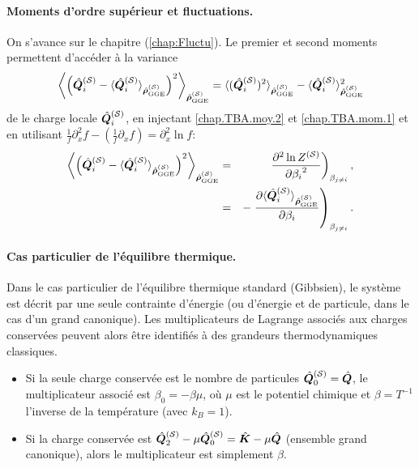 \paragraph{Moments d’ordre supérieur et fluctuations.} On s'avance sur le chapitre (\ref{chap:Fluctu}).
Le premier et second moments permettent d’accéder à la variance 
\begin{eqnarray}
	 \left \langle \left (\hat{\bm{Q}}_i^{(\mathcal{S})} - \langle\hat{\bm{Q}}_i^{(\mathcal{S})} \rangle_{\hat{\bm{\rho}}^{(\mathcal{S})}_{\mathrm{GGE}}} \right )^2  \right \rangle_{\hat{\bm{\rho}}^{(\mathcal{S})}_{\mathrm{GGE}}} = \langle(\hat{\bm{Q}}_i^{(\mathcal{S})})^2 \rangle_{\hat{\bm{\rho}}^{(\mathcal{S})}_{\mathrm{GGE}}}  -  \langle\hat{\bm{Q}}_i^{(\mathcal{S})} \rangle_{\hat{\bm{\rho}}^{(\mathcal{S})}_{\mathrm{GGE}}}^2	
\end{eqnarray}
de le charge locale $\hat{\bm{Q}}_i^{(\mathcal{S})}$, en injectant \eqref{chap.TBA.moy.2} et \eqref{chap.TBA.mom.1} et en utilisant $\frac{1}{f} \partial_x^2 f - ( \frac{1}{f} \partial_x f ) = \partial_x^2 \ln f  $:
\begin{eqnarray}
	\left \langle \left (\hat{\bm{Q}}_i^{(\mathcal{S})} - \langle\hat{\bm{Q}}_i^{(\mathcal{S})} \rangle_{\hat{\bm{\rho}}^{(\mathcal{S})}_{\mathrm{GGE}}} \right )^2  \right \rangle_{\hat{\bm{\rho}}^{(\mathcal{S})}_{\mathrm{GGE}}}  &=&	  \left . \frac{\partial^2 \ln Z^{(\mathcal{S})}  }{{\partial \beta_i}^2 }  \right )_{\beta_{j\neq i}},\\
	& = &  - \left . 	\frac{\partial \langle\hat{\bm{Q}}_i^{(\mathcal{S})} \rangle_{\hat{\bm{\rho}}^{(\mathcal{S})}_{\mathrm{GGE}}} }{\partial \beta_i } \right )_{\beta_{j\neq i}}.	
\end{eqnarray}

\paragraph{Cas particulier de l’équilibre thermique.}

Dans le cas particulier de l’équilibre thermique standard (\ie Gibbsien), le système est décrit par une seule contrainte d’énergie (ou d’énergie et de particule, dans le cas d’un grand canonique). Les multiplicateurs de Lagrange associés aux charges conservées peuvent alors être identifiés à des grandeurs thermodynamiques classiques.

\begin{itemize}[label=$\bullet$]
	\item Si la seule charge conservée est le nombre de particules $\hat{\bm{Q}}_0^{(\mathcal{S})} = \hat{\bm{Q}}$, le multiplicateur associé est $\beta_0 = -\beta \mu$, où $\mu$ est le potentiel chimique et $\beta = T^{-1}$ l’inverse de la température (avec $k_B = 1$).
	
	\item Si la charge conservée est $\hat{\bm{Q}}_2^{(\mathcal{S})}-\mu\hat{\bm{Q}}_0^{(\mathcal{S})}  = \hat{\bm{K}} - \mu \hat{\bm{Q}} $ (ensemble grand canonique), alors le multiplicateur est simplement $ \beta$.
\end{itemize}

